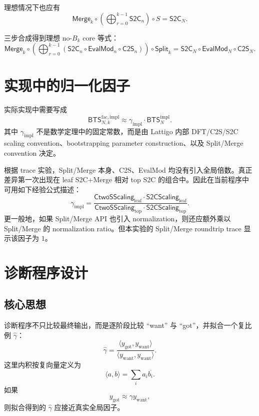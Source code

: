 \documentclass[UTF8,a4paper,11pt]{ctexart}
\newcommand{\CtwoS}{\mathsf{C2S}}
\newcommand{\StwoC}{\mathsf{S2C}}
\newcommand{\EvalMod}{\mathsf{EvalMod}}
\newcommand{\Split}{\mathsf{Split}}
\newcommand{\Merge}{\mathsf{Merge}}
\newcommand{\BTS}{\mathsf{BTS}}
\newcommand{\CtwoSScaling}{\mathsf{CtwoSScaling}}
\newcommand{\StwoCScaling}{\mathsf{S2CScaling}}
\begin{document}
理想情况下也应有
\begin{equation}
\boxed{
\Merge_k\circ
\left(\bigoplus_{r=0}^{k-1}\StwoC_n\right)
\circ S
=
\StwoC_N.
}
\end{equation}

三步合成得到理想 no-$B_k$ core 等式：
\begin{equation}
\boxed{
\Merge_k\circ
\left(\bigoplus_{r=0}^{k-1}
\left(\StwoC_n\circ\EvalMod_n\circ\CtwoS_n\right)
\right)
\circ\Split_k
=
\StwoC_N\circ\EvalMod_N\circ\CtwoS_N.
}
\end{equation}

\section{实现中的归一化因子}

实际实现中需要写成
\begin{equation}
\boxed{
\BTS_{N,k}^{\mathrm{fac,impl}}
\approx
\gamma_{\mathrm{impl}}\cdot\BTS_N^{\mathrm{impl}}.
}
\end{equation}
其中 $\gamma_{\mathrm{impl}}$ 不是数学定理中的固定常数，而是由 Lattigo 内部 DFT/C2S/S2C scaling convention、bootstrapping parameter construction、以及 Split/Merge convention 决定。

根据 trace 实验，Split/Merge 本身、C2S、EvalMod 均没有引入全局倍数。真正差异第一次出现在 leaf S2C+Merge 相对 top S2C 的组合中。因此在当前程序中可用如下经验公式描述：
\begin{equation}
\boxed{
\gamma_{\mathrm{impl}}
=
\frac{
\CtwoSScaling_{\mathrm{leaf}}\cdot\StwoCScaling_{\mathrm{leaf}}
}{
\CtwoSScaling_{\mathrm{top}}\cdot\StwoCScaling_{\mathrm{top}}
}.
}
\end{equation}
更一般地，如果 Split/Merge API 也引入 normalization，则还应额外乘以 Split/Merge 的 normalization ratio。但本实验的 Split/Merge roundtrip trace 显示该因子为 $1$。

\section{诊断程序设计}

\subsection{核心思想}

诊断程序不只比较最终输出，而是逐阶段比较 ``want'' 与 ``got''，并拟合一个复比例 $\widehat{\gamma}$：
\begin{equation}
\widehat{\gamma}
=
\frac{\langle y_{\mathrm{got}},y_{\mathrm{want}}\rangle}{\langle y_{\mathrm{want}},y_{\mathrm{want}}\rangle}.
\end{equation}
这里内积按复向量定义为
\begin{equation}
\langle a,b\rangle=\sum_i a_i\overline{b_i}.
\end{equation}
如果
\begin{equation}
 y_{\mathrm{got}}\approx \gamma y_{\mathrm{want}},
\end{equation}
则拟合得到的 $\widehat{\gamma}$ 应接近真实全局因子。
\end{document}

